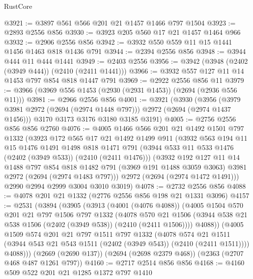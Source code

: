 \begin{lexlean}{RustCore}
\begin{coremodule}
@3921 := @3897 @561 @566 @201 @21 @1457 @1466 @797 @1504
@3923 := @2893 @2556 @856
@3930 := @3923 @205 @560 @17 @21 @1457 @1464 @966
@3932 := @2906 @2556 @856
@3942 := @3932 @550 @559 @11 @15 @1441 @1456 @1463 @818 @1436 @791
@3944 := @2394 @2556 @856
@3948 := @3944 @444 @11 @444 @1441
@3949 := @2403 @2556
@3956 := @3942 (@3948 (@2402 (@3949 @444)) (@2410 (@2411 @1441)))
@3966 := @3932 @557 @127 @11 @14 @1453 @797 @854 @818 @1447 @791
@3969 := @2922 @2556 @856 @11
@3979 := @3966 (@3969 @556 @1453 (@2930 (@2931 @1453)) (@2694 (@2936 @556 @11)))
@3981 := @2966 @2556 @856
@4001 := @3921
    (@3930
      (@3956 (@3979 @3981 @2972 (@2694 (@2974 @1448 @797))) @2972 (@2694 (@2974 @1437 @1456)))
      @3170
      @3173
      @3176
      @3180
      @3185
      @3191)
@4005 := @2756 @2556 @856 @856 @2760
@4076 := @4005
    @1466
    @566
    @201
    @21
    @1492
    @1501
    @797
    @1332
    (@3923
      @172
      @565
      @17
      @21
      @1492
      @1499
      @911
      (@3932
        @563
        @194
        @11
        @15
        @1476
        @1491
        @1498
        @818
        @1471
        @791
        (@3944 @533 @11 @533 @1476 (@2402 (@3949 @533)) (@2410 (@2411 @1476)))
        (@3932
          @192
          @127
          @11
          @14
          @1488
          @797
          @854
          @818
          @1482
          @791
          (@3969 @191 @1488 @3059 @3063)
          @3981
          @2972
          (@2694 (@2974 @1483 @797)))
        @2972
        (@2694 (@2974 @1472 @1491)))
      @2990
      @2994
      @2999
      @3004
      @3010
      @3019)
@4078 := @2732 @2556 @856
@4088 := @4078 @201 @21 @1332 (@2776 @2556 @856 @198 @21 @1331 @3096)
@4157 := @2531
    (@3894
      (@3905
        (@3913
          (@4001 (@4076 @4088))
          (@4005
            @1504
            @570
            @201
            @21
            @797
            @1506
            @797
            @1332
            (@4078
              @570
              @21
              @1506
              (@3944 @538 @21 @538 @1506 (@2402 (@3949 @538)) (@2410 (@2411 @1506))))
            @4088))
        (@4005
          @1509
          @574
          @201
          @21
          @797
          @1511
          @797
          @1332
          (@4078
            @574
            @21
            @1511
            (@3944 @543 @21 @543 @1511 (@2402 (@3949 @543)) (@2410 (@2411 @1511))))
          @4088)))
    (@2669 (@2690 @137))
    (@2694 (@2698 @2379 @468))
    (@2363 (@2707 @468 @487 @1261 @797))
@4160 := @2717 @2514 @856 @856
@4168 := @4160 @509 @522 @201 @21 @1285 @1372 @797 @1410

\end{coremodule}
\end{lexlean}
